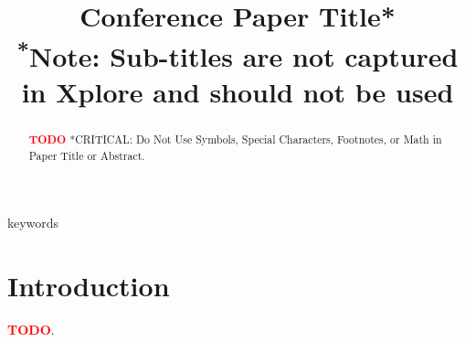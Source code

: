 \documentclass[conference]{IEEEtran}
\newcommand{\TODO}[1]{\textbf{\textcolor{red}{#1}}\xspace}
\newcommand{\TODOB}{\TODO{TODO}\xspace}
\begin{document}
\title{Conference Paper Title*\\
{\footnotesize \textsuperscript{*}Note: Sub-titles are not captured in Xplore and
should not be used}
}

\author{
\and
{}
}

\maketitle

\begin{abstract}
\TODOB
*CRITICAL: Do Not Use Symbols, Special Characters, Footnotes, or Math in Paper Title or
Abstract.
\end{abstract}

\begin{IEEEkeywords}
keywords
\end{IEEEkeywords}

\section{Introduction}
\label{sec:Introduction}

\TODOB\cite{test}.


\end{document}
